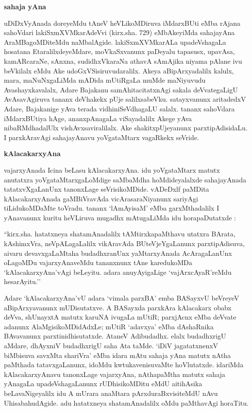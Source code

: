 \bigskip
\begin{center}
{\Large\bf sahaja yAna}
\end{center}

uDiDxVyAnada doreyeMdu tAneV heVLikoMDiruva iMdarxBUti eMba rAjana sahoVdari lakiSxmXVMkarAdeVvi (kirx.sha. {\rm 729}) eMbAkeyiMda sahajayAna AraMBa\-goMDiteMdu naMbalAgide. lakiSxmXVMkarALa upadeVshagaLa hosatana EtaralilxdeyeMdare, moVkaSxvanunx paDeyalu tapasusx, upavAsa, kamARcaraNe, sAnxna, sudidhxVkaraNa athavA sAmAjika niyama pAlane ivu beVkilalx eMdu Ake udoGxVSisiruvudaralilx. Akeya aBipArxyadalilx kalulx, mara, maNuNxgaLiMda mADida mUtiRgaLa muMde maNiyuvudu Avashayxkavalalx, Adare Bajakanu samAhitacitatxnAgi sakala deVvategaLigU AvAsavAgiruva tananx deVhakekx pUje salilxsabeVku. satayxvanunx aritadedxV Adare, Bajakanige yAva terada vidhiniSeVdhagaLU salalx. tananx sahoVdara iMdarxBUtiya hAge, ananxpAnagaLa viSayadalilx Akege yAva nibaRMdhadalUlx vishAvxsaviralilalx. Ake shakitxpUjeyanunx parxtipAdisidaLu. I parxkAravAgi sahajayAnavu yoVgataMtarx vagaRkekx seVride.

\bigskip
\begin{center}
{\Large\bf kAlacakarxyAna}
\end{center}

vajarxyAnada Icina beLasu kAlacakarxyAna. idu yoVgataMtarx matutx anutatxra yoVgataMtarxgaLoMdige saMbaMdha hoMdideyalalxde sahajayAnada tatatxvXgaLanUnx tanonxLage seVrisikoMDide. vADeDxlf paMDita kAlacakarxyAnada gaMBiVravAda vicArasaraNiyanunx sariyAgi tiLidukoMDaMte toVradu. tananx `lAmAyisaM' eMba garxMthadalilx I yAnavanunx kuritu heVLiruva mugadhx mAtugaLiMda idu horapaDutatxde :

``kirx.sha. hatatxneya shatamAnadalilx tAMtirxkapaMthavu utatxra BArata, kAshimxVra, neVpALagaLalilx vikAravAda BUteVjeYgaLanunx parxtipAdisuva, aivaru devavxgaLaMtaha budadhxranUnx yaMtarxyAnada AcAragaLanUnx oLagoMDu vajarxyAnaveMdu tananxnunx tAne karedukoMDa `kAlacakarxyAna'vAgi beLeyitu. adara anuyAyigaLige `vajArxcAyaR'reMdu hesarAyitu.''

Adare `kAlacakarxyAna'vU adara `vimala parxBA' emba BASayxvU beVreyeV aBipArxyavanunx mUDisutatxve. A BASayxda parxkAra kAlacakarx obabx deVva, shUnayxtA matutx karuNA ivugaLa mUtiR; parxjAcnx eMba deVvate adanunx AlaMgisikoMDidAdxLe; mUtiR `adavxya' eMba dAshaRnika BAvavanunx parxtinidhisutatxde. AtaneV Adibudadhx. elalx budadhxrigU aMdare, dhAyxniV budadhxrigU saha Ata taMde. `iDiV jagatatxnenxV biMbisuva savxMta shariVra' eMba idara mAtu sahaja yAna matutx nAtha paMthada tatavxgaLanunx, idoMdu kwtukavenisuvaMte hoVlutatxde. idariMda kAlacakarxyAnavu tanonxLage vajarxyAna, nAthapaMtha matutx sahaja yAnagaLa upadeVshagaLanunx rUDhisikoMDitu eMdU aitihAsika beLavaNigeyalilx idu A mUrara anaMtara pArxduraBxvisiteMdU nAvu UhisabahudAgide. adu hatatxneya shatamAnadalilx oMdu paMthavAgi horaTitu.

